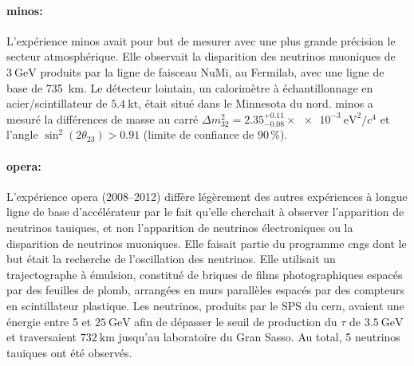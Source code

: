         \paragraph{\gls{minos}\cite{Collaboration2014}:} L'expérience \gls{minos} avait pour but de mesurer avec une plus grande précision le secteur atmosphérique. Elle observait la disparition des neutrinos muoniques de $\SI{3}{\giga\electronvolt}$ produits par la ligne de faisceau NuMi, au Fermilab, avec une ligne de base de \SI{735}{\kilo\meter}. Le détecteur lointain, un calorimètre à échantillonnage en acier/scintillateur de $\SI{5.4}{\kilo\tonne}$, était situé dans le Minnesota du nord. \gls{minos} a mesuré la différences de masse au carré $\Delta m_{32}^2 = 2.35^{+0.11}_{-0.08}\times\SI{e-3}{\electronvolt\squared\per c^4}$ et l'angle $\sin^2(2\theta_{23}) > 0.91$ (limite de confiance de 90\,\%). 

        \paragraph{\gls{opera}\cite{Agafonova2018}:} L'expérience \gls{opera} (2008--2012) diffère légèrement des autres expériences à longue ligne de base d'accélérateur par le fait qu'elle cherchait à observer l'apparition de neutrinos tauiques, et non l'apparition de neutrinos électroniques ou la disparition de neutrinos muoniques. Elle faisait partie du programme \gls{cngs} dont le but était la recherche de l'oscillation des neutrinos. Elle utilisait un trajectographe à émulsion, constitué de  briques de films photographiques espacés par des feuilles de plomb, arrangées en murs parallèles espacés par des compteurs en scintillateur plastique. Les neutrinos, produits par le SPS du \gls{cern}, avaient une énergie entre 5 et $\SI{25}{\giga\electronvolt}$ afin de dépasser le seuil de production du $\tau$ de $\SI{3.5}{\giga\electronvolt}$ et traversaient $\SI{732}{\kilo\meter}$ jusqu'au laboratoire du Gran Sasso. Au total, 5 neutrinos tauiques ont été observés.
        
